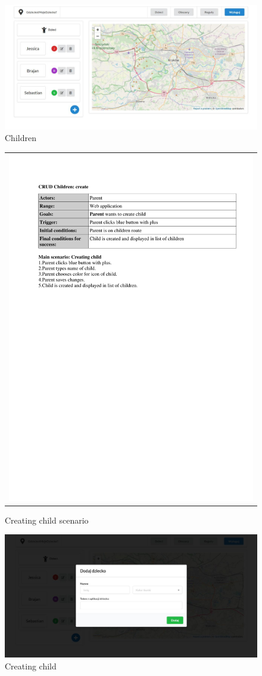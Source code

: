 \documentclass{sprawozdanie-agh}
\begin{document}
		\begin{figure}[H]
			\centering
			\includegraphics[width=.80\textwidth]{children}
			\caption{Children}
		\end{figure}

		\begin{figure}[H] 
			\centering
			\begin{tabular}{c}
				\includegraphics[width=.80\textwidth]{childrenCreate} 
			\end{tabular} 
		\caption{Creating child scenario}
		\end{figure}

		\begin{figure}[H]
			\centering
			\includegraphics[width=.80\textwidth]{addChild}
			\caption{Creating child}
		\end{figure}
\end{document}
